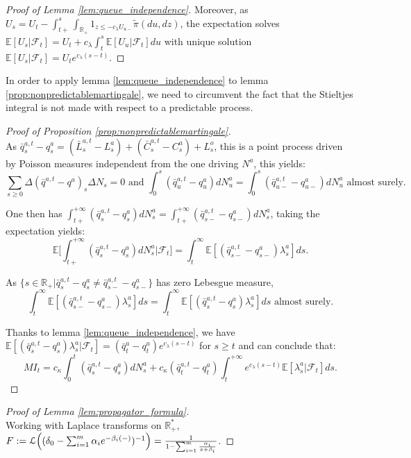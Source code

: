 \documentclass{article} %
\newcommand{\1}{\mathbbm{1}} %
\newcommand{\E}{\mathbb{E}}
\newcommand{\R}{\mathbb{R}}
\begin{document}
\begin{as}
\begin{proof}[Proof of Lemma \ref{lem:queue_independence}]
    Moreover, as $U_s = U_t - \int_{t+}^s \int_{\R_+} 1_{z \leq -c_\lambda U_{u-}} \tilde{\pi}(du, dz)$, the expectation solves $\E[U_s|\mathcal{F}_t] = U_t + c_\lambda \int_{t}^s \E[U_u|\mathcal{F}_t] du$ with unique solution $\E[U_s|\mathcal{F}_t] = U_t e^{c_\lambda (s-t)}$.
\end{proof}

In order to apply lemma \ref{lem:queue_independence} to lemma \ref{prop:nonpredictablemartingale}, we need to circumvent the fact that the Stieltjes integral is not made with respect to a predictable process.

\begin{proof}[Proof of Proposition \ref{prop:nonpredictablemartingale}]
    \leavevmode \\
    As $\bar{q}^{a,t}_s - q^a_s = (\bar{L}^{a,t}_s - L^a_s) + (\bar{C}^{a,t}_s - C^a_s) + L^o_s$, this is a point process driven by Poisson measures independent from the one driving $N^a$, this yields:
    $$\sum_{s\geq 0} \Delta(\bar{q}^{a,t} - q^a)_s \Delta N_s = 0 \text{ and } \int_0^s (\bar{q}^{a,t}_u - q^a_u)dN^a_u = \int_0^s (\bar{q}^{a,t}_{u-} - q^a_{u-})dN^a_u \text{ almost surely.}$$

    One then has $\int_{t+}^{+\infty} (\bar{q}^{a,t}_s - q^a_s) dN^a_s = \int_{t+}^{+\infty} (\bar{q}^{a,t}_{s-} - q^a_{s-}) dN^a_s$, taking the expectation yields: 
    $$\E\bigg[ \int_{t+}^{+\infty} (\bar{q}^{a,t}_s - q^a_s) dN^a_s  \bigg| \mathcal{F}_t\bigg] = \int_t^\infty \mathbb{E}[(\bar{q}^{a,t}_{s-} - q^a_{s-})\lambda^a_s]ds.$$

    As $\{ s \in \R_+ | \bar{q}^{a,t}_s - q^a_s \neq \bar{q}^{a,t}_{s-} - q^a_{s-} \}$ has zero Lebesgue measure, 
    $$\int_t^\infty \mathbb{E}[(\bar{q}^{a,t}_{s-} - q^a_{s-})\lambda^a_s]ds = \int_t^\infty \mathbb{E}[(\bar{q}^{a,t}_{s} - q^a_{s})\lambda^a_s]ds \text{ almost surely.}$$

    Thanks to lemma \ref{lem:queue_independence}, we have $\E[(\bar{q}^{a,t}_s - q^a_s)\lambda^a_s |\mathcal{F}_t] = (\bar{q}^a_t - q^a_t) e^{c_\lambda (s-t)}$ for $s \geq t$ and can conclude that:
    \begin{equation*}
    MI_t = c_{\kappa} \int_0^t (\bar{q}^{a,t}_s - q^{a}_s) dN^a_s + c_{\kappa} (\bar{q}^{a,t}_t - q^{a}_t)\int_t^{+\infty} e^{c_{\lambda}(s-t)} \E[\lambda^a_s|\mathcal{F}_t] ds.
    \end{equation*}
\end{proof}

\begin{proof}[Proof of Lemma \ref{lem:propagator_formula}]
    \leavevmode \\
    Working with Laplace transforms on $\R_+^*$, $F := \mathcal{L}\Bigl( (\delta_0 - \sum_{i=1}^m \alpha_i e^{-\beta_i (-)})^{-1} \Bigr) = \frac{1}{1 - \sum_{i=1}^m \frac{\alpha_i}{x + \beta_i}}$.
    

\end{proof}
\end{as}
\end{document}
